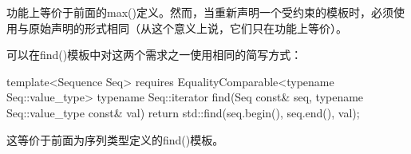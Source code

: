 功能上等价于前面的max()定义。然而，当重新声明一个受约束的模板时，必须使用与原始声明的形式相同（从这个意义上说，它们只在功能上等价）。

可以在find()模板中对这两个需求之一使用相同的简写方式：

\begin{cpp}
template<Sequence Seq>
	requires EqualityComparable<typename Seq::value_type>
typename Seq::iterator find(Seq const& seq,
							typename Seq::value_type const& val) {
	return std::find(seq.begin(), seq.end(), val);
}
\end{cpp}

这等价于前面为序列类型定义的find()模板。





